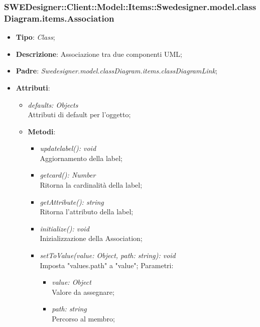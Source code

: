 \documentclass[../DefinizioneDiProdotto.tex]{subfiles}
\begin{document}
			\subsubsection{SWEDesigner::Client::Model::Items::Swedesigner.model.classDiagram.items.Association}
			\hypertarget{SWEDesigner::Client::Model::Items::Swedesigner.model.classDiagram.items.Association}{}
			\begin{itemize}
				\item \textbf{Tipo}: \emph{Class};
				\item \textbf{Descrizione}: Associazione tra due componenti UML;
				\item \textbf{Padre}: \emph{Swedesigner.model.classDiagram.items.classDiagramLink};
				\item \textbf{Attributi}:
				\begin{itemize}
					\item \emph{defaults: Objects}\\
					Attributi di default per l'oggetto;
					\item \textbf{Metodi}:
					\begin{itemize}
						\item \emph{updatelabel(): void}\\
						Aggiornamento della label;
						\item \emph{getcard(): Number}\\
						Ritorna la cardinalità della label;
						\item \emph{getAttribute(): string}\\
						Ritorna l'attributo della label;
						\item \emph{initialize(): void}\\
						Inizializzazione della Association;
						\item \emph{setToValue(value: Object, path: string): void}\\
						Imposta "values.path" a "value";
						Parametri:
						\begin{itemize}
							\item \emph{value: Object} \\
							Valore da assegnare;
							\item \emph{path: string} \\
							Percorso al membro;
						\end{itemize}
					\end{itemize}
				\end{itemize}
			\end{itemize}
			
\end{document}

